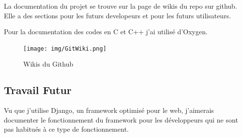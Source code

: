 \documentclass[12pt]{article}
\begin{document}
\begin{par}
	La documentation du projet se trouve sur la page de wikis du repo
	sur github. Elle a des sections pour les futurs developeurs et pour
	les futurs utilisateurs.
\end{par}
\begin{par}
	Pour la documentation des codes en C et C++ j'ai utilisé d'Oxygen.
\end{par}

\begin{figure}[!htb]
	\centering
	\texttt{[image: img/GitWiki.png]}
	\caption{Wikis du Github}
	\label{img:git:wikis1}
\end{figure}

\subsection*{Travail Futur}
\begin{par}
 Vu que j'utilise Django, un framework optimisé pour le web, j'aimerais documenter le fonctionnement du framework pour les développeurs qui ne sont pas habitués à ce type de fonctionnement.
\end{par}


\end{document}
